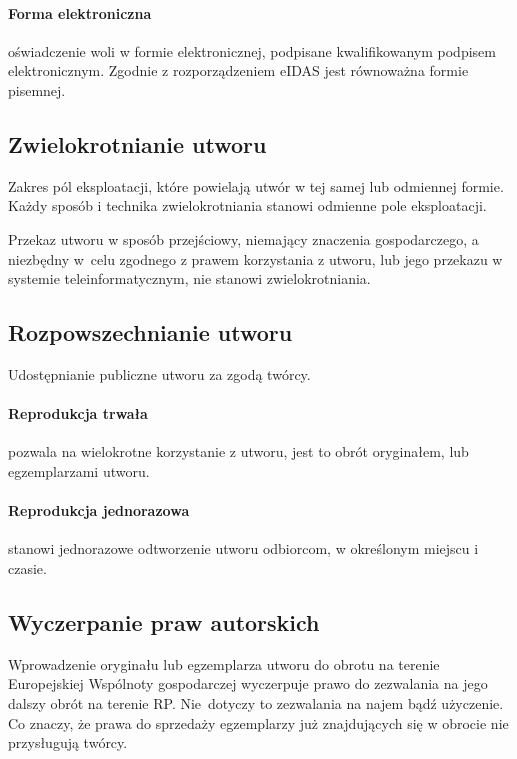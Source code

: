 \documentclass{article}
\begin{document}
\paragraph{Forma elektroniczna}

oświadczenie woli w formie elektronicznej, podpisane kwalifikowanym podpisem elektronicznym. Zgodnie z rozporządzeniem eIDAS jest równoważna formie pisemnej.

\subsection{Zwielokrotnianie utworu}

Zakres pól eksploatacji, które powielają utwór w tej samej lub odmiennej formie. Każdy sposób i technika zwielokrotniania stanowi odmienne pole eksploatacji.

Przekaz utworu w sposób przejściowy, niemający znaczenia gospodarczego, a niezbędny w~celu zgodnego z prawem korzystania z utworu, lub jego przekazu w systemie teleinformatycznym, nie stanowi zwielokrotniania.

\subsection{Rozpowszechnianie utworu}

Udostępnianie publiczne utworu za zgodą twórcy.

\paragraph{Reprodukcja trwała}

pozwala na wielokrotne korzystanie z utworu, jest to obrót oryginałem, lub egzemplarzami utworu.

\paragraph{Reprodukcja jednorazowa}

stanowi jednorazowe odtworzenie utworu odbiorcom, w określonym miejscu i czasie.

\subsection{Wyczerpanie praw autorskich}

Wprowadzenie oryginału lub egzemplarza utworu do obrotu na terenie Europejskiej Wspólnoty gospodarczej wyczerpuje prawo do zezwalania na jego dalszy obrót na terenie RP. Nie~dotyczy to zezwalania na najem bądź użyczenie.
Co znaczy, że prawa do sprzedaży egzemplarzy już znajdujących się w obrocie nie przysługują twórcy.
\end{document}
